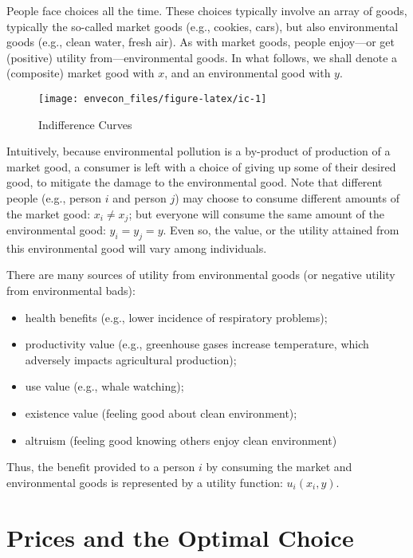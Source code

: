 \documentclass[
]{book}
\providecommand{\tightlist}{%
  \setlength{\itemsep}{0pt}\setlength{\parskip}{0pt}}
\begin{document}
People face choices all the time. These choices typically involve an array of goods, typically the so-called market goods (e.g., cookies, cars), but also environmental goods (e.g., clean water, fresh air). As with market goods, people enjoy---or get (positive) utility from---environmental goods. In what follows, we shall denote a (composite) market good with \(x\), and an environmental good with \(y\).

\begin{figure}

{\centering \texttt{[image: envecon\_files/figure-latex/ic-1]} 

}

\caption{Indifference Curves}\label{fig:ic}
\end{figure}

Intuitively, because environmental pollution is a by-product of production of a market good, a consumer is left with a choice of giving up some of their desired good, to mitigate the damage to the environmental good. Note that different people (e.g., person \(i\) and person \(j\)) may choose to consume different amounts of the market good: \(x_i\neq x_j\); but everyone will consume the same amount of the environmental good: \(y_i=y_j=y\). Even so, the value, or the utility attained from this environmental good will vary among individuals.

There are many sources of utility from environmental goods (or negative utility from environmental bads):

\begin{itemize}
\tightlist
\item
  health benefits (e.g., lower incidence of respiratory problems);
\item
  productivity value (e.g., greenhouse gases increase temperature, which adversely impacts agricultural production);
\item
  use value (e.g., whale watching);
\item
  existence value (feeling good about clean environment);
\item
  altruism (feeling good knowing others enjoy clean environment)
\end{itemize}

Thus, the benefit provided to a person \(i\) by consuming the market and environmental goods is represented by a utility function: \(u_i(x_i,y)\).

\hypertarget{prices-and-the-optimal-choice}{%
\section{Prices and the Optimal Choice}\label{prices-and-the-optimal-choice}}
\end{document}
